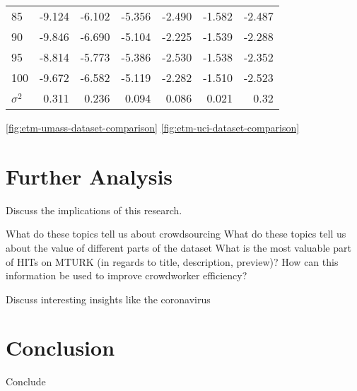\documentclass[letterpaper,12pt]{article}
\begin{document}
\begin{table}
\begin{center}
\begin{tabular}{| l | rr | rr | rr |}
			85  & -9.124 & -6.102 &      -5.356 & -2.490 &  -1.582 & -2.487 \\
			90  & -9.846 & -6.690 &      -5.104 & -2.225 &  -1.539 & -2.288 \\
			95  & -8.814 & -5.773 &      -5.386 & -2.530 &  -1.538 & -2.352 \\
			100 & -9.672 & -6.582 &      -5.119 & -2.282 &  -1.510 & -2.523 \\
			\hline
			$\sigma^2$ & 0.311 & 0.236 & 0.094 & 0.086 & 0.021 & 0.32 \\
			\hline
			\end{tabular}
	\end{center}
\end{table}
\ref{fig:etm-umass-dataset-comparison}
\ref{fig:etm-uci-dataset-comparison}



\chapter{Further Analysis}
Discuss the implications of this research.

What do these topics tell us about crowdsourcing
What do these topics tell us about the value of different parts of the dataset
What is the most valuable part of HITs on MTURK (in regards to title, description, preview)?
How can this information be used to improve crowdworker efficiency?

Discuss interesting insights like the coronavirus
\chapter{Conclusion}
Conclude



\end{document}

